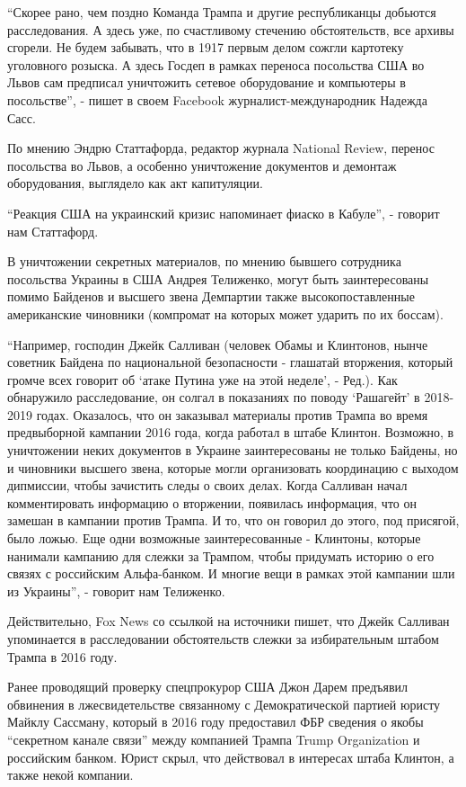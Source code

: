 \enquote{Скорее рано, чем поздно Команда Трампа и другие республиканцы добьются
расследования. А здесь уже, по счастливому стечению обстоятельств, все архивы
сгорели. Не будем забывать, что в 1917 первым делом сожгли картотеку уголовного
розыска. А здесь Госдеп в рамках переноса посольства США во Львов сам предписал
уничтожить сетевое оборудование и компьютеры в посольстве}, - пишет в своем
Facebook журналист-международник Надежда Сасс.

По мнению Эндрю Статтафорда, редактор журнала National Review, перенос
посольства во Львов, а особенно уничтожение документов и демонтаж оборудования,
выглядело как акт капитуляции.

\enquote{Реакция США на украинский кризис напоминает фиаско в Кабуле}, -
говорит нам Статтафорд.

В уничтожении секретных материалов, по мнению бывшего сотрудника посольства
Украины в США Андрея Телиженко, могут быть заинтересованы помимо Байденов и
высшего звена Демпартии также высокопоставленные американские чиновники
(компромат на которых может ударить по их боссам).

\enquote{Например, господин Джейк Салливан (человек Обамы и Клинтонов, нынче советник
Байдена по национальной безопасности - глашатай вторжения, который громче всех
говорит об \enquote{атаке Путина уже на этой неделе}, - Ред.). Как обнаружило
расследование, он солгал в показаниях по поводу \enquote{Рашагейт} в 2018-2019 годах.
Оказалось, что он заказывал материалы против Трампа во время предвыборной
кампании 2016 года, когда работал в штабе Клинтон. Возможно, в уничтожении
неких документов в Украине заинтересованы не только Байдены, но и чиновники
высшего звена, которые могли организовать координацию с выходом дипмиссии,
чтобы зачистить следы о своих делах. Когда Салливан начал комментировать
информацию о вторжении, появилась информация, что он замешан в кампании против
Трампа. И то, что он говорил до этого, под присягой, было ложью. Еще одни
возможные заинтересованные - Клинтоны, которые нанимали кампанию для слежки за
Трампом, чтобы придумать историю о его связях с российским Альфа-банком. И
многие вещи в рамках этой кампании шли из Украины}, - говорит нам Телиженко.

Действительно, Fox News со ссылкой на источники пишет, что Джейк Салливан
упоминается в расследовании обстоятельств слежки за избирательным штабом Трампа
в 2016 году.

Ранее проводящий проверку спецпрокурор США Джон Дарем предъявил обвинения в
лжесвидетельстве связанному с Демократической партией юристу Майклу Сассману,
который в 2016 году предоставил ФБР сведения о якобы \enquote{секретном канале связи}
между компанией Трампа Trump Organization и российским банком. Юрист скрыл, что
действовал в интересах штаба Клинтон, а также некой компании.

